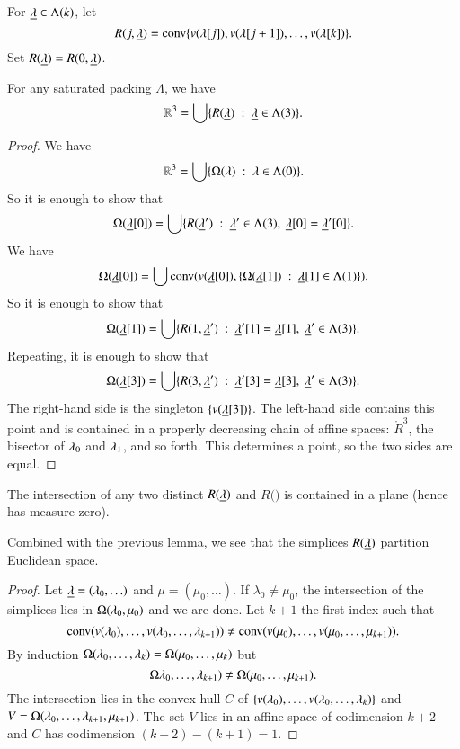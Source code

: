 For ${\underline{\lambda}}\in\Lambda(k)$, let 
$$R(j,{\underline{\lambda}}) = {\operatorname{conv}}\{v(\lambda[j]), v(\lambda[j+1]),\ldots,v(\lambda[k])\}.$$  Set $R({\underline{\lambda}})=R(0,{\underline{\lambda}})$.


\begin{lemma}
For any saturated packing $\Lambda$, we have
$$\mathbb{R}^3 = \bigcup \{ R({\underline{\lambda}}) \ :\  {\underline{\lambda}}\in \Lambda(3)\}.$$
\end{lemma}

\begin{proof}
We have $$\mathbb{R}^3 = \bigcup \{\Omega(\lambda)\ :\  \lambda\in \Lambda(0)\}.$$
So it is enough to show that
$$\Omega({\underline{\lambda}}[0]) = \bigcup \{ R({\underline{\lambda}}') \ :\  {\underline{\lambda}}'\in \Lambda(3),~{\underline{\lambda}}[0]={\underline{\lambda}}'[0]\}.$$
We have
$$\Omega({\underline{\lambda}}[0]) = \bigcup {\operatorname{conv}}(v({\underline{\lambda}}[0]),\{\Omega({\underline{\lambda}}[1])\ :\  {\underline{\lambda}}[1]\in \Lambda(1)\}).$$
So it is enough to show that
$$\Omega({\underline{\lambda}}[1]) = \bigcup \{ R(1,{\underline{\lambda}}') \ :\  {\underline{\lambda}}'[1]={\underline{\lambda}}[1],~{\underline{\lambda}}'\in \Lambda(3)\}.$$
Repeating, it is enough to show that
$$\Omega({\underline{\lambda}}[3]) = \bigcup\{R(3,{\underline{\lambda}}')\ :\ {\underline{\lambda}}'[3]={\underline{\lambda}}[3],~{\underline{\lambda}}'\in\Lambda(3)\}.$$
The right-hand side is the singleton $\{v({\underline{\lambda}}[3])\}$.  The left-hand side
contains this point and is contained in a properly decreasing chain of affine spaces:
$\ring{R}^3$, the bisector of $\lambda_0$ and $\lambda_1$, and so forth.  This determines a point,
so the two sides are equal.
\end{proof}

\begin{lemma}  
The intersection of any two distinct $R({\underline{\lambda}})$ and $R(\bm)$ is contained in a plane (hence has measure zero).
\end{lemma}

Combined with the previous lemma, we see that the simplices $R({\underline{\lambda}})$ partition Euclidean
space.

\begin{proof}  Let ${\underline{\lambda}} = (\lambda_0,\ldots)$ and $\mu = (\mu_0,\ldots)$.
If $\lambda_0\ne\mu_0$, the intersection of the simplices lies in $\Omega(\lambda_0,\mu_0)$
and we are done.  Let $k+1$ the first index such that
$${\operatorname{conv}}(v(\lambda_0),\ldots,v(\lambda_0,\ldots,\lambda_{k+1}))\ne
{\operatorname{conv}}(v(\mu_0),\ldots,v(\mu_0,\ldots,\mu_{k+1})).
$$
By induction $\Omega(\lambda_0,\ldots,\lambda_k) = \Omega(\mu_0,\ldots,\mu_k)$
but
$$\Omega\lambda_0,\ldots,\lambda_{k+1}) \ne \Omega(\mu_0,\ldots,\mu_{k+1}).$$
The intersection lies in the convex hull $C$ of
$\{v(\lambda_0),\ldots,v(\lambda_0,\ldots,\lambda_k)\}$ and
$V=\Omega(\lambda_0,\ldots,\lambda_{k+1},\mu_{k+1})$.  The set $V$ lies in an affine space of 
codimension $k+2$
and $C$ has codimension $(k+2) - (k+1) = 1$.
\end{proof}


